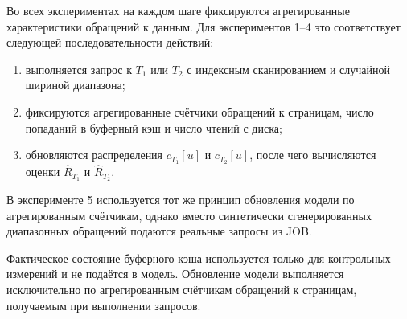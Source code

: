 Во всех экспериментах на каждом шаге фиксируются агрегированные характеристики обращений к данным. Для экспериментов 1--4 это соответствует следующей последовательности действий:
\begin{enumerate}
    \item выполняется запрос к \(T_1\) или \(T_2\) с индексным сканированием и случайной шириной диапазона;
    \item фиксируются агрегированные счётчики обращений к страницам, число попаданий в буферный кэш и число чтений с диска;
    \item обновляются распределения \(c_{T_1}[u]\) и \(c_{T_2}[u]\), после чего вычисляются оценки \(\widehat{R}_{T_1}\) и \(\widehat{R}_{T_2}\).
\end{enumerate}

В эксперименте 5 используется тот же принцип обновления модели по агрегированным счётчикам, однако вместо синтетически сгенерированных диапазонных обращений подаются реальные запросы из JOB.

Фактическое состояние буферного кэша используется только для контрольных измерений и не подаётся в модель. Обновление модели выполняется исключительно по агрегированным счётчикам обращений к страницам, получаемым при выполнении запросов.

